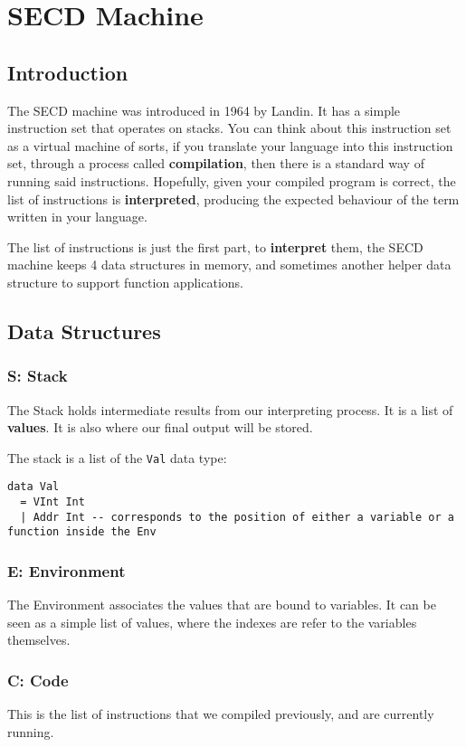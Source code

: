 \section{SECD Machine}
\subsection{Introduction}
The SECD machine was introduced in 1964 by Landin. It has a simple instruction set that operates
on stacks. You can think about this instruction set as a virtual machine of sorts, if you translate
your language into this instruction set, through a process called \textbf{compilation},
then there is a standard way of running said instructions. Hopefully, given your compiled program is
correct, the list of instructions is \textbf{interpreted}, producing the expected behaviour of the term written in your language.

The list of instructions is just the first part, to \textbf{interpret} them, the SECD machine keeps 4 data structures in memory, 
and sometimes another helper data structure to support function applications.

\subsection{Data Structures}
\subsubsection{S: Stack}
The Stack holds intermediate results from our interpreting process. It is a list of \textbf{values}.
It is also where our final output will be stored.

The stack is a list of the \texttt{Val} data type:
\begin{lstlisting}
data Val
  = VInt Int
  | Addr Int -- corresponds to the position of either a variable or a function inside the Env
\end{lstlisting}

\subsubsection{E: Environment}
The Environment associates the values that are bound to variables. It can be seen as a simple list of values, where the indexes are refer to the
variables themselves.
\subsubsection{C: Code}
This is the list of instructions that we compiled previously, and are currently running.
